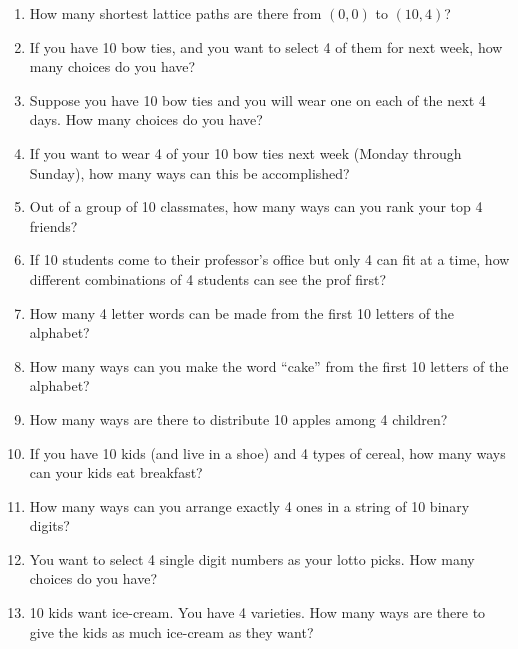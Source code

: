 \documentclass[10pt,]{book}
\theoremstyle{plain}
\theoremstyle{definition}
\theoremstyle{definition}
\theoremstyle{definition}
\numberwithin{equation}{section}
\begin{document}
\begin{exerciselist}
          \leavevmode%
\begin{enumerate}[label=(\alph*)]
\item\hypertarget{li-667}{}
                How many shortest lattice paths are there from \((0,0)\) to \((10,4)\)?
\item\hypertarget{li-668}{}
                If you have 10 bow ties, and you want to select 4 of them for next week, how many choices do you have?
\item\hypertarget{li-669}{}
                Suppose you have 10 bow ties and you will wear one on each of the next 4 days. How many choices do you have?
\item\hypertarget{li-670}{}
                If you want to wear 4 of your 10 bow ties next week (Monday through Sunday), how many ways can this be accomplished?
\item\hypertarget{li-671}{}
                Out of a group of 10 classmates, how many ways can you rank your top 4 friends?
\item\hypertarget{li-672}{}
                If 10 students come to their professor's office but only 4 can fit at a time, how different combinations of 4 students can see the prof first?
\item\hypertarget{li-673}{}
                How many 4 letter words can be made from the first 10 letters of the alphabet?
\item\hypertarget{li-674}{}
                How many ways can you make the word ``cake'' from the first 10 letters of the alphabet?
\item\hypertarget{li-675}{}
                How many ways are there to distribute 10 apples among 4 children?
\item\hypertarget{li-676}{}
                If you have 10 kids (and live in a shoe) and 4 types of cereal, how many ways can your kids eat breakfast?
\item\hypertarget{li-677}{}
                How many ways can you arrange exactly 4 ones in a string of 10 binary digits?
\item\hypertarget{li-678}{}
                You want to select 4 single digit numbers as your lotto picks. How many choices do you have?
\item\hypertarget{li-679}{}
                10 kids want ice-cream. You have 4 varieties. How many ways are there to give the kids as much ice-cream as they want?

\end{enumerate}
\end{exerciselist}
\end{document}
